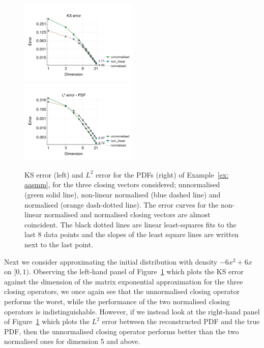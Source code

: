 \begin{example}\label{ex: aasmm}
	\begin{figure}[h]
		\centering
		\includegraphics[width=0.5\textwidth,trim={0.5cm 0.8cm 0.2cm 1.25cm},clip]{chapter6/figs/qbdrap_closing_vec/fun6/ks_error_formatted.pdf}%
		\includegraphics[width=0.5\textwidth,trim={0.5cm 0.8cm 0.2cm 1.25cm},clip]{chapter6/figs/qbdrap_closing_vec/fun6/l2_pdf_error_formatted.pdf}
		\caption{KS error (left) and \(L^2\) error for the PDFs (right) of Example~\ref{ex: aasmm}, for the three closing vectors considered; unnormalised (green solid line), non-linear normalised (blue dashed line) and normalised (orange dash-dotted line). The error curves for the non-linear normalised and normalised closing vectors are almost coincident. The black dotted lines are linear least-squares fits to the last 8 data points and the slopes of the least square lines are written next to the last point.}
		\label{fig: fun 6 ks error qbdrap closing vecs}
	\end{figure}
	Next we consider approximating the initial distribution with density \(-6x^2+6x\) on \([0,1)\). Observing the left-hand panel of Figure~\ref{fig: fun 6 ks error qbdrap closing vecs} which plots the KS error against the dimension of the matrix exponential approximation for the three closing operators, we once again see that the unnormalised closing operator performs the worst, while the performance of the two normalised closing operators is indistinguishable. However, if we instead look at the right-hand panel of Figure~\ref{fig: fun 6 ks error qbdrap closing vecs} which plots the \(L^2\) error between the reconstructed PDF and the true PDF, then the unnormalised closing operator performs better than the two normalised ones for dimension 5 and above. 


\end{example}
